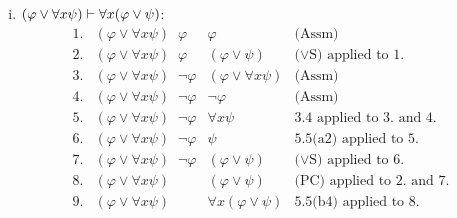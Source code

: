 \begin{enumerate}[1.]
\begin{enumerate}[(i)]
\[
\begin{array}{llll}
1. & \forall x (\varphi \lor \psi) \;\; \varphi & \varphi & \mbox{(Assm)} \\
2. & \forall x (\varphi \lor \psi) \;\; \varphi & (\varphi \lor \forall x \psi) & \mbox{($\lor$S) applied to 1.} \\
3. & \forall x (\varphi \lor \psi) \;\; \neg \varphi & \forall x (\varphi \lor \psi) & \mbox{(Assm)} \\
4. & \forall x (\varphi \lor \psi) \;\; \neg \varphi & (\varphi \lor \psi) & \mbox{5.5(a2) applied to 3.} \\
5. & \forall x (\varphi \lor \psi) \;\; \neg \varphi & \neg \varphi & \mbox{(Assm)} \\
6. & \forall x (\varphi \lor \psi) \;\; \neg \varphi & \psi & \mbox{3.4 applied to 4. and 5.} \\
7. & \forall x (\varphi \lor \psi) \;\; \neg \varphi & \forall x \psi & \mbox{5.5(b4) applied to 6.} \\
8. & \forall x (\varphi \lor \psi) \;\; \neg \varphi & (\varphi \lor \forall x \psi) & \mbox{($\lor$S) applied to 7.} \\
9. & \forall x (\varphi \lor \psi) & (\varphi \lor \forall x \psi) & \mbox{(PC) applied to 2. and 8.}
\end{array}
\]
\item $(\varphi \lor \forall x \psi) \vdash \forall x (\varphi \lor \psi)$:
\[
\begin{array}{llll}
1. & (\varphi \lor \forall x \psi) \;\; \varphi & \varphi & \mbox{(Assm)} \\
2. & (\varphi \lor \forall x \psi) \;\; \varphi & (\varphi \lor \psi) & \mbox{($\lor$S) applied to 1.} \\
3. & (\varphi \lor \forall x \psi) \;\; \neg \varphi & (\varphi \lor \forall x \psi) & \mbox{(Assm)} \\
4. & (\varphi \lor \forall x \psi) \;\; \neg \varphi & \neg \varphi & \mbox{(Assm)} \\
5. & (\varphi \lor \forall x \psi) \;\; \neg \varphi & \forall x \psi & \mbox{3.4 applied to 3. and 4.} \\
6. & (\varphi \lor \forall x \psi) \;\; \neg \varphi & \psi & \mbox{5.5(a2) applied to 5.} \\
7. & (\varphi \lor \forall x \psi) \;\; \neg \varphi & (\varphi \lor \psi) & \mbox{($\lor$S) applied to 6.} \\
8. & (\varphi \lor \forall x \psi) & (\varphi \lor \psi) & \mbox{(PC) applied to 2. and 7.} \\
9. & (\varphi \lor \forall x \psi) & \forall x (\varphi \lor \psi) & \mbox{5.5(b4) applied to 8.}
\end{array}
\]
\end{enumerate}
\end{enumerate}
